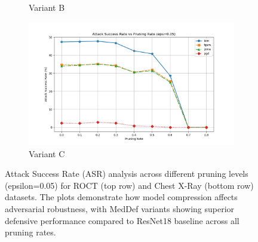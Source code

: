 \documentclass[preprint,12pt]{elsarticle}
\begin{document}
\begin{figure}[!t]
\begin{subfigure}[b]{0.24\columnwidth}
\caption{Variant B}
\label{fig:asr_no_afd_mfe_005_b}
\end{subfigure}
\hfill
\begin{subfigure}[b]{0.24\columnwidth}
\centering
\includegraphics[width=\columnwidth]{fig/asr-prunning/chest_xray/0.05_no_afd.png}
\caption{Variant C}
\label{fig:asr_no_afd_005_b}
\end{subfigure}
\caption{Attack Success Rate (ASR) analysis across different pruning levels (epsilon=0.05) for ROCT (top row) and Chest X-Ray (bottom row) datasets. The plots demonstrate how model compression affects adversarial robustness, with MedDef variants showing superior defensive performance compared to ResNet18 baseline across all pruning rates.}
\label{fig:asr_analysis_005}
\end{figure}
\end{document}
